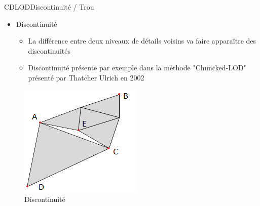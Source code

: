 \documentclass[french]{beamer}
\begin{document}
\begin{frame}{CDLOD}{Discontinuité / Trou}
    

    \begin{itemize}
    \item Discontinuité 
    \begin{itemize}
        \item La différence entre deux niveaux de détails voisins va faire apparaître des discontinuités
        \item Discontinuité présente par exemple dans la méthode "Chuncked-LOD" présenté par Thatcher Ulrich en 2002\protect\footnotemark
    \end{itemize}
\end{itemize}

\begin{figure}
   \includegraphics[scale=0.7]{img/cracks.png}
   \caption{Discontinuité \protect\footnotemark}
\end{figure}
    

\end{frame}
\end{document}
